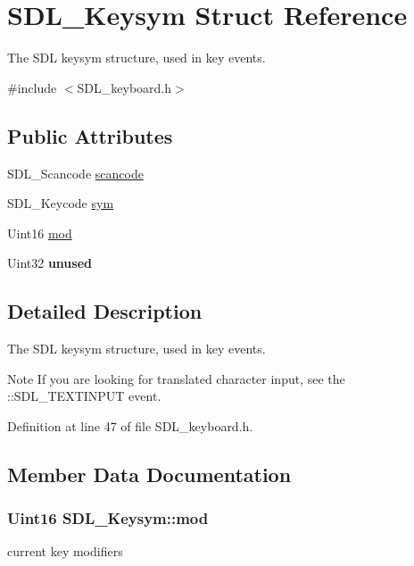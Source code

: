 \hypertarget{structSDL__Keysym}{\section{S\+D\+L\+\_\+\+Keysym Struct Reference}
\label{structSDL__Keysym}
}


The S\+D\+L keysym structure, used in key events.  




{\ttfamily \#include $<$S\+D\+L\+\_\+keyboard.\+h$>$}

\subsection*{Public Attributes}
\begin{DoxyCompactItemize}
\item 
S\+D\+L\+\_\+\+Scancode \hyperlink{structSDL__Keysym_ad47e9120a511e2efc7ec0c6d8a5ec51e}{scancode}
\item 
S\+D\+L\+\_\+\+Keycode \hyperlink{structSDL__Keysym_a082ff1fd787b79fa6c3a445deb225f08}{sym}
\item 
Uint16 \hyperlink{structSDL__Keysym_ab519d1b8a9939d3d035f7103f3208291}{mod}
\item 
\hypertarget{structSDL__Keysym_ab1d0a50cc619966fb06b92e15cc46dd9}{Uint32 {\bfseries unused}}\label{structSDL__Keysym_ab1d0a50cc619966fb06b92e15cc46dd9}

\end{DoxyCompactItemize}


\subsection{Detailed Description}
The S\+D\+L keysym structure, used in key events. 

\begin{DoxyNote}{Note}
If you are looking for translated character input, see the \+::\+S\+D\+L\+\_\+\+T\+E\+X\+T\+I\+N\+P\+U\+T event. 
\end{DoxyNote}


Definition at line 47 of file S\+D\+L\+\_\+keyboard.\+h.



\subsection{Member Data Documentation}
\hypertarget{structSDL__Keysym_ab519d1b8a9939d3d035f7103f3208291}{
\subsubsection[{mod}]{\setlength{\rightskip}{0pt plus 5cm}Uint16 S\+D\+L\+\_\+\+Keysym\+::mod}}\label{structSDL__Keysym_ab519d1b8a9939d3d035f7103f3208291}
current key modifiers 

